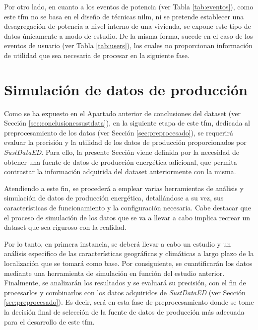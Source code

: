 \vspace{3mm}

Por otro lado, en cuanto a los eventos de potencia (ver Tabla \ref{tab:eventos}), como este \gls{tfm} no se basa en el diseño de técnicas \gls{nilm}, ni se pretende establecer una desagregación de potencia a nivel interno de una vivienda, se expone este tipo de datos únicamente a modo de estudio. De la misma forma, sucede en el caso de los eventos de usuario (ver Tabla \ref{tab:users}), los cuales no proporcionan información de utilidad que sea necesaria de procesar en la siguiente fase.

\section{Simulación de datos de producción}
\label{sec:global}

Como se ha expuesto en el Apartado anterior de conclusiones del dataset (ver Sección \ref{sec:conclusionessustdata}), en la siguiente etapa de este \gls{tfm}, dedicada al preprocesamiento de los datos (ver Sección \ref{sec:preprocesado}), se requerirá evaluar la precisión y la utilidad de los datos de producción proporcionados por \textit{SustDataED}. Para ello, la presente Sección viene definida por la necesidad de obtener una fuente de datos de producción energética adicional, que permita contrastar la información adquirida del dataset anteriormente con la misma.

\vspace{3mm}

Atendiendo a este fin, se procederá a emplear varias herramientas de análisis y simulación de datos de producción energética, detallándose a su vez, sus características de funcionamiento y la configuración necesaria. Cabe destacar que el proceso de simulación de los datos que se va a llevar a cabo implica recrear un dataset que sea riguroso con la realidad.

\vspace{3mm}

Por lo tanto, en primera instancia, se deberá llevar a cabo un estudio y un análisis específico de las características geográficas y climáticas a largo plazo de la localización que se tomará como base. Por consiguiente, se cuantificarán los datos mediante una herramienta de simulación en función del estudio anterior. Finalmente, se analizarán los resultados y se evaluará su precisión, con el fin de procesarlos y combinarlos con los datos adquiridos de \textit{SustDataED} (ver Sección \ref{sec:preprocesado}). Es decir, será en esta fase de preprocesamiento donde se tome la decisión final de selección de la fuente de datos de producción más adecuada para el desarrollo de este \gls{tfm}.

